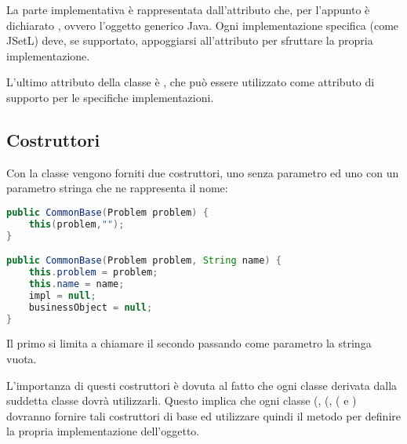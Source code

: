 La parte implementativa è rappresentata dall'attributo  che, per
l'appunto è dichiarato , ovvero l'oggetto generico Java. Ogni
implementazione specifica (come JSetL) deve, se supportato, appoggiarsi
all'attributo  per sfruttare la propria implementazione.

L'ultimo attributo della classe è , che può essere
utilizzato come attributo di supporto per le specifiche implementazioni.

\subsection{Costruttori}
Con la classe  vengono forniti due costruttori, uno senza 
parametro ed uno con un parametro stringa che ne rappresenta il nome:
\begin{lstlisting}[language = Java,
                   caption = {\files{costruttori di CommonBase}.}]
public CommonBase(Problem problem) {
	this(problem,"");
}

public CommonBase(Problem problem, String name) {
	this.problem = problem;
	this.name = name;
	impl = null;
	businessObject = null;
}
\end{lstlisting}
Il primo si limita a chiamare il secondo passando come parametro la stringa
vuota.

L'importanza di questi costruttori è dovuta al fatto che ogni classe derivata
dalla suddetta classe dovrà utilizzarli. Questo implica che ogni classe
(,  (, ( e
) dovranno fornire tali costruttori di base ed 
utilizzare quindi il metodo  per definire la propria
implementazione dell'oggetto.  


